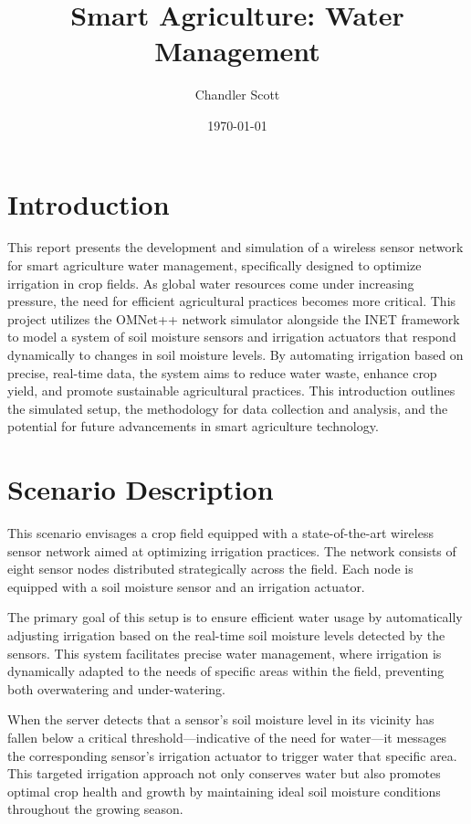 \documentclass[12pt]{article}
\title{Smart Agriculture: Water Management}
\author{Chandler Scott}
\date{\today}
\begin{document}
\maketitle
\clearpage
\section{Introduction}\label{sec:intro}
This report presents the development and simulation of a wireless sensor network for smart agriculture water management, specifically designed to optimize irrigation in crop fields. As global water resources come under increasing pressure, the need for efficient agricultural practices becomes more critical. This project utilizes the OMNet++ network simulator alongside the INET framework to model a system of soil moisture sensors and irrigation actuators that respond dynamically to changes in soil moisture levels. By automating irrigation based on precise, real-time data, the system aims to reduce water waste, enhance crop yield, and promote sustainable agricultural practices. This introduction outlines the simulated setup, the methodology for data collection and analysis, and the potential for future advancements in smart agriculture technology.

\section{Scenario Description}\label{sec:scenario}
This scenario envisages a crop field equipped with a state-of-the-art wireless sensor network aimed at optimizing irrigation practices. The network consists of eight sensor nodes distributed strategically across the field. Each node is equipped with a soil moisture sensor and an irrigation actuator.

The primary goal of this setup is to ensure efficient water usage by automatically adjusting irrigation based on the real-time soil moisture levels detected by the sensors. This system facilitates precise water management, where irrigation is dynamically adapted to the needs of specific areas within the field, preventing both overwatering and under-watering.

When the server detects that a sensor's soil moisture level in its vicinity has fallen below a critical threshold—indicative of the need for water—it messages the corresponding sensor's irrigation actuator to trigger water that specific area. This targeted irrigation approach not only conserves water but also promotes optimal crop health and growth by maintaining ideal soil moisture conditions throughout the growing season.
\end{document}
